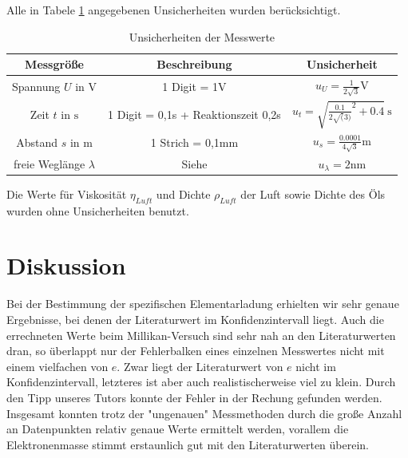 \documentclass[11pt, a4paper]{article}
\begin{document}
    Alle in Tabele \ref{unsichmili} angegebenen Unsicherheiten wurden berücksichtigt.
    \begin{table}
        \begin{tabular}{c | c | c}
            Messgröße & Beschreibung & Unsicherheit \\ \hline
            Spannung $U$ in $\si{\volt}$ & 1 Digit = 1V & $u_U = \frac{1}{2\sqrt{3}} \si{\volt}$ \\
            Zeit $t$ in $\si{\second}$ & 1 Digit = 0,1s + Reaktionszeit 0,2s & $u_t = \sqrt{\frac{0.1}{2\sqrt(3)}^2 + 0.4} \ \si{\second}$ \\            Abstand $s$ in $\si{\metre}$ & 1 Strich = 0,1mm & $u_s = \frac{0.0001}{4\sqrt{3}} \si{\metre}$ \\
            freie Weglänge $\lambda$ & Siehe \cite{ELE} & $u_\lambda = 2 \si{\nano\metre}$ \\
        \end{tabular}
        \caption{Unsicherheiten der Messwerte}
        \label{unsichmili}
    \end{table}
    Die Werte für Viskosität $\eta_{Luft}$ und Dichte $\rho_{Luft}$ der Luft \cite[]{Luft} sowie Dichte des Öls \cite{ELE} wurden ohne Unsicherheiten benutzt.




    \section{Diskussion}
    Bei der Bestimmung der spezifischen Elementarladung erhielten wir sehr genaue Ergebnisse, bei denen der Literaturwert im Konfidenzintervall liegt. Auch die errechneten Werte beim Millikan-Versuch sind sehr nah an den Literaturwerten dran, so überlappt nur der Fehlerbalken eines einzelnen Messwertes nicht mit einem vielfachen von $e$. Zwar liegt der Literaturwert von $e$ nicht im Konfidenzintervall, letzteres ist aber auch realistischerweise viel zu klein. Durch den Tipp unseres Tutors konnte der Fehler in der Rechung gefunden werden. Insgesamt konnten trotz der "ungenauen" Messmethoden durch die große Anzahl an Datenpunkten relativ genaue Werte ermittelt werden, vorallem die Elektronenmasse stimmt erstaunlich gut mit den Literaturwerten überein.
    
    

    
    
\end{document}
